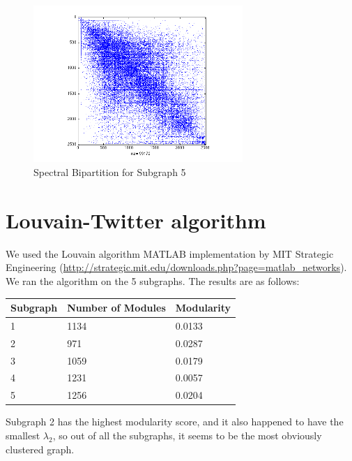 \documentclass[11pt]{article}
\begin{document}
		 \begin{figure}
		 		\begin{center}
		  		\includegraphics[width=300px]{../graphs/spectral_partition_a5.png}
		  	\end{center}
		  	\caption{Spectral Bipartition for Subgraph 5}
		  	\label{fig:sb5}
		 \end{figure}
		  

\section{Louvain-Twitter algorithm}
We used the Louvain algorithm MATLAB implementation by MIT Strategic Engineering (\url{http://strategic.mit.edu/downloads.php?page=matlab_networks}). We ran the algorithm on the 5 subgraphs. The results are as follows:

\begin{table}[!htbp]
		\begin{tabular}{lll}
		Subgraph & Number of Modules & Modularity \\
	  \hline
		1 & 1134 & 0.0133 \\
		2 & 971 & 0.0287 \\
		3 & 1059 & 0.0179 \\
		4 & 1231 & 0.0057 \\
		5 & 1256 & 0.0204 \\
		\end{tabular}
\end{table}

Subgraph 2 has the highest modularity score, and it also happened to have the smallest $\lambda_2$, so out of all the subgraphs, it seems to be the most obviously clustered graph.
     
\end{document}
